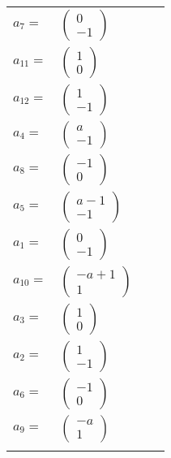 \documentclass[1p]{elsarticle_modified}
\theoremstyle{definition}
\begin{document}
\begin{tabular}{m{7pt} m{180pt} m{7pt} m{180pt} }
\flushright $a_{7}=$&$\begin{pmatrix}0\\-1\end{pmatrix}$ \\
\flushright $a_{11}=$&$\begin{pmatrix}1\\0\end{pmatrix}$ \\
\flushright $a_{12}=$&$\begin{pmatrix}1\\-1\end{pmatrix}$ \\
\flushright $a_{4}=$&$\begin{pmatrix}a\\-1\end{pmatrix}$ \\
\flushright $a_{8}=$&$\begin{pmatrix}-1\\0\end{pmatrix}$ \\
\flushright $a_{5}=$&$\begin{pmatrix}a-1\\-1\end{pmatrix}$ \\
\flushright $a_{1}=$&$\begin{pmatrix}0\\-1\end{pmatrix}$ \\
\flushright $a_{10}=$&$\begin{pmatrix}- a+1\\1\end{pmatrix}$ \\
\flushright $a_{3}=$&$\begin{pmatrix}1\\0\end{pmatrix}$ \\
\flushright $a_{2}=$&$\begin{pmatrix}1\\-1\end{pmatrix}$ \\
\flushright $a_{6}=$&$\begin{pmatrix}-1\\0\end{pmatrix}$ \\
\flushright $a_{9}=$&$\begin{pmatrix}- a\\1\end{pmatrix}$\\&\end{tabular}
\end{document}
